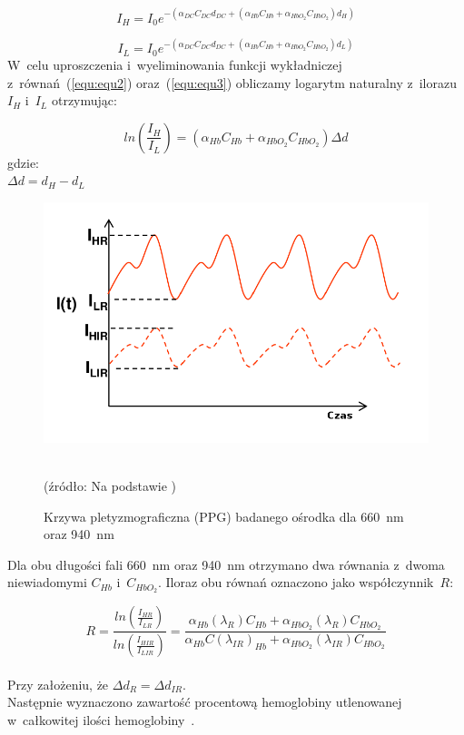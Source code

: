 \begin{equation}
\label{equ:equ2}
	I_{H}=I_{0}e^{-(\alpha_{DC}C_{DC}d_{DC}+(\alpha_{Hb}C_{Hb}+\alpha_{HbO_{2}}C_{HbO_{2}})d_{H})}
\end{equation}

\begin{equation}
\label{equ:equ3}
	I_{L}=I_{0}e^{-(\alpha_{DC}C_{DC}d_{DC}+(\alpha_{Hb}C_{Hb}+\alpha_{HbO_{2}}C_{HbO_{2}})d_{L})}
\end{equation}
\noindent W~celu uproszczenia i~wyeliminowania funkcji wykładniczej z~równań~(\ref{equ:equ2}) oraz~(\ref{equ:equ3}) obliczamy logarytm naturalny z~ilorazu $I_{H}$ i~$I_{L}$ otrzymując:

\begin{equation}
\label{equ:equ4}
	ln(\frac{I_{H}}{I_{L}})=(\alpha_{Hb}C_{Hb}+\alpha_{HbO_{2}}C_{HbO_{2}})\Delta d
\end{equation}
gdzie:\\
$\Delta d=d_{H}-d_{L}$

\begin{figure}[ht]
\centerline{\includegraphics[scale = 0.40]{graphic/maxmin1.png}}
	\caption{Krzywa pletyzmograficzna (PPG) badanego ośrodka dla 660~nm oraz 940~nm}
	\label{rys:maxmin1}
	~\\
	(źródło: Na podstawie \cite{Dwyer:2008})
\end{figure}

\noindent Dla obu długości fali 660~nm oraz 940~nm otrzymano dwa równania z~dwoma niewiadomymi $C_{Hb}$ i~$C_{HbO_{2}}$. Iloraz obu równań oznaczono jako współczynnik~$R$:

\begin{equation}
\label{equ:equ4}
	R=\frac{ln(\frac{I_{HR}}{I_{LR}})}{ln(\frac{I_{HIR}}{I_{LIR}})}=\frac{\alpha_{Hb}(\lambda_{R})C_{Hb}+\alpha_{HbO_{2}}(\lambda_{R})C_{HbO_{2}}}{\alpha_{Hb}C(\lambda_{IR})_{Hb}+\alpha_{HbO_{2}}(\lambda_{IR})C_{HbO_{2}}}
\end{equation}\\
\noindent Przy założeniu, że $\Delta d_{R} = \Delta d_{IR}$.\\ 
\noindent Następnie wyznaczono zawartość procentową hemoglobiny utlenowanej w~całkowitej ilości hemoglobiny~\cite{Fuzzy:2011}.

